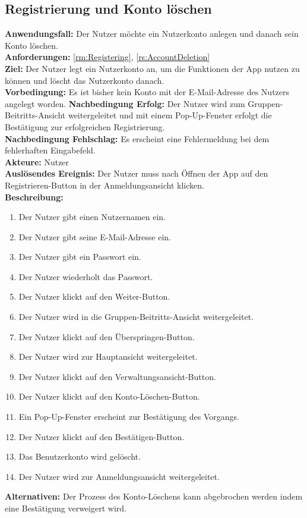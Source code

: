 \documentclass[parskip=full]{scrartcl}
\begin{document}
\subsection{Registrierung und Konto löschen}
\label{uc:RegisteringDeletingAccount}
\textbf{Anwendungsfall:} Der Nutzer möchte ein Nutzerkonto anlegen und danach sein Konto löschen.\\
\textbf{Anforderungen:} \ref{rm:Registering}, \ref{rs:AccountDeletion} \\
\textbf{Ziel:} Der Nutzer legt ein Nutzerkonto an, um die Funktionen der App nutzen zu können und löscht das Nutzerkonto danach.\\
\textbf{Vorbedingung:} Es ist bisher kein Konto mit der E-Mail-Adresse des Nutzers angelegt worden.
\textbf{Nachbedingung Erfolg:} Der Nutzer wird zum Gruppen-Beitritts-Ansicht weitergeleitet und mit einem Pop-Up-Fenster erfolgt die Bestätigung zur erfolgreichen Registrierung.\\
\textbf{Nachbedingung Fehlschlag:} Es erscheint eine Fehlermeldung bei dem fehlerhaften Eingabefeld.\\
\textbf{Akteure:} Nutzer\\
\textbf{Auslösendes Ereignis:} Der Nutzer muss nach Öffnen der App auf den Registrieren-Button in der Anmeldungsansicht klicken.\\
\textbf{Beschreibung:}
\begin{enumerate}
    \item Der Nutzer gibt einen Nutzernamen ein.
    \item Der Nutzer gibt seine E-Mail-Adresse ein.
    \item Der Nutzer gibt ein Passwort ein.
    \item Der Nutzer wiederholt das Passwort.
    \item Der Nutzer klickt auf den Weiter-Button.
    \item Der Nutzer wird in die Gruppen-Beitritts-Ansicht weitergeleitet.
    \item Der Nutzer klickt auf den Überspringen-Button.
    \item Der Nutzer wird zur Hauptansicht weitergeleitet.
    \item Der Nutzer klickt auf den Verwaltungsansicht-Button.
    \item Der Nutzer klickt auf den Konto-Löschen-Button.
    \item Ein Pop-Up-Fenster erscheint zur Bestätigung des Vorgangs.
    \item Der Nutzer klickt auf den Bestätigen-Button.
    \item Das Benutzerkonto wird gelöscht.
    \item Der Nutzer wird zur Anmeldungsansicht weitergeleitet.
\end{enumerate}
\textbf{Alternativen:} Der Prozess des Konto-Löschens kann abgebrochen werden indem eine Bestätigung verweigert wird.
\newpage
\end{document}
